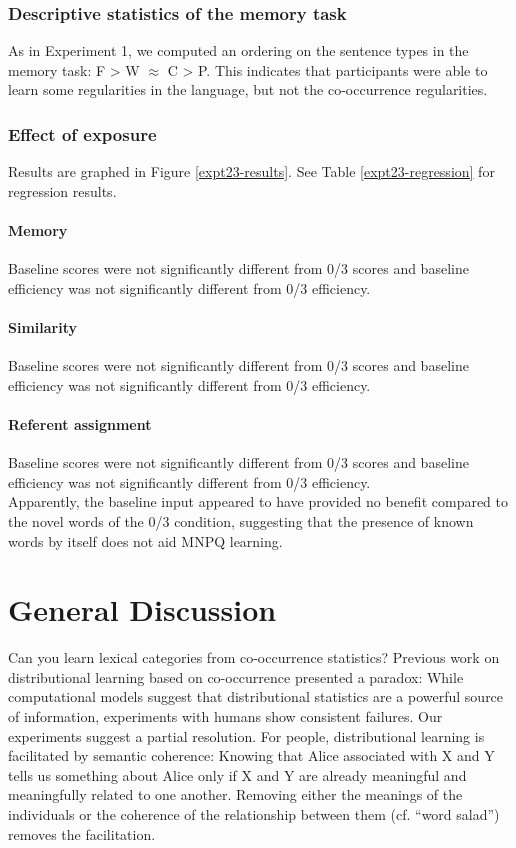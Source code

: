 \documentclass[man,floatsintext]{apa6}
\begin{document}
\subsubsection{Descriptive statistics of the memory task}
As in Experiment 1, we computed an ordering on the sentence types in the memory task: F > W $\approx$ C > P. This indicates that participants were able to learn some regularities in the language, but not the co-occurrence regularities.

\subsubsection{Effect of exposure}

Results are graphed in Figure \ref{expt23-results}. See Table \ref{expt23-regression} for regression results.

\paragraph{Memory}
Baseline scores were not significantly different from 0/3 scores and baseline efficiency was not significantly different from 0/3 efficiency.

\paragraph{Similarity}
Baseline scores were not significantly different from 0/3 scores and baseline efficiency was not significantly different from 0/3 efficiency.

\paragraph{Referent assignment}
Baseline scores were not significantly different from 0/3 scores and baseline efficiency was not significantly different from 0/3 efficiency.\\

Apparently, the baseline input appeared to have provided no benefit compared to the novel words of the 0/3 condition, suggesting that the presence of known words by itself does not aid MNPQ learning.

\section{General Discussion}
Can you learn lexical categories from co-occurrence statistics? Previous work on distributional learning based on co-occurrence presented a paradox: While computational models suggest that distributional statistics are a powerful source of information, experiments with humans show consistent failures. Our experiments suggest a partial resolution. For people, distributional learning is facilitated by semantic coherence: Knowing that Alice associated with X and Y tells us something about Alice only if X and Y are already meaningful and meaningfully related to one another. Removing either the meanings of the individuals or the coherence of the relationship between them (cf. ``word salad'') removes the facilitation. 
\end{document}
